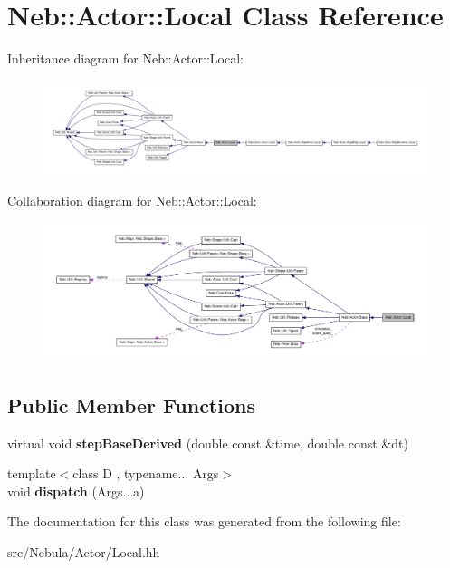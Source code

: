 \hypertarget{classNeb_1_1Actor_1_1Local}{\section{\-Neb\-:\-:\-Actor\-:\-:\-Local \-Class \-Reference}
\label{classNeb_1_1Actor_1_1Local}
}


\-Inheritance diagram for \-Neb\-:\-:\-Actor\-:\-:\-Local\-:\nopagebreak
\begin{figure}[H]
\begin{center}
\leavevmode
\includegraphics[width=350pt]{classNeb_1_1Actor_1_1Local__inherit__graph}
\end{center}
\end{figure}


\-Collaboration diagram for \-Neb\-:\-:\-Actor\-:\-:\-Local\-:\nopagebreak
\begin{figure}[H]
\begin{center}
\leavevmode
\includegraphics[width=350pt]{classNeb_1_1Actor_1_1Local__coll__graph}
\end{center}
\end{figure}
\subsection*{\-Public \-Member \-Functions}
\begin{DoxyCompactItemize}
\item 
\hypertarget{classNeb_1_1Actor_1_1Local_a20f18375878717048985151e3c839162}{virtual void {\bfseries step\-Base\-Derived} (double const \&time, double const \&dt)}\label{classNeb_1_1Actor_1_1Local_a20f18375878717048985151e3c839162}

\item 
\hypertarget{classNeb_1_1Actor_1_1Local_a9972679c266abadbfe8a5abbd57e3a1e}{{\footnotesize template$<$class D , typename... \-Args$>$ }\\void {\bfseries dispatch} (\-Args...\-a)}\label{classNeb_1_1Actor_1_1Local_a9972679c266abadbfe8a5abbd57e3a1e}

\end{DoxyCompactItemize}


\-The documentation for this class was generated from the following file\-:\begin{DoxyCompactItemize}
\item 
src/\-Nebula/\-Actor/\-Local.\-hh\end{DoxyCompactItemize}
